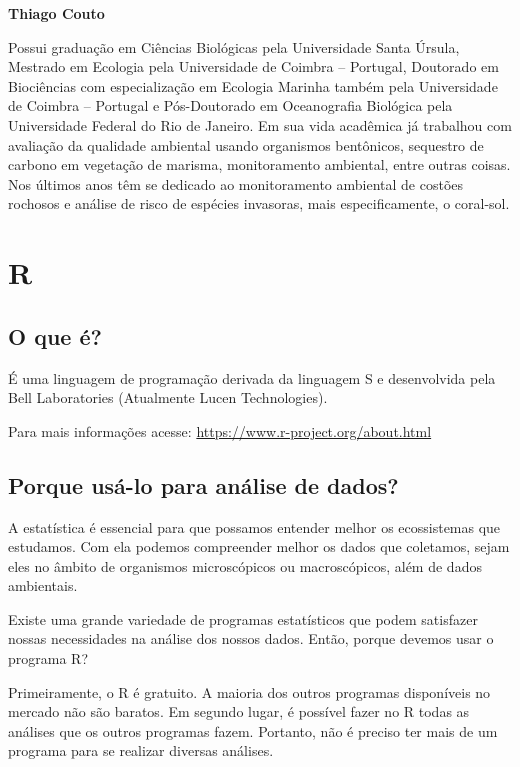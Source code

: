\documentclass[titlepage, oneside, openany, a4paper]{book}
\begin{document}
\textbf{Thiago Couto}

Possui graduação em Ciências Biológicas pela Universidade Santa Úrsula, Mestrado em Ecologia pela Universidade de Coimbra -- Portugal, Doutorado em Biociências com especialização em Ecologia Marinha também pela Universidade de Coimbra -- Portugal e Pós-Doutorado em Oceanografia Biológica pela Universidade Federal do Rio de Janeiro. Em sua vida acadêmica já trabalhou com avaliação da qualidade ambiental usando organismos bentônicos, sequestro de carbono em vegetação de marisma, monitoramento ambiental, entre outras coisas. Nos últimos anos têm se dedicado ao monitoramento ambiental de costões rochosos e análise de risco de espécies invasoras, mais especificamente, o coral-sol.

\hypertarget{r}{%
\chapter{R}\label{r}}

\hypertarget{o-que-uxe9}{%
\section{O que é?}\label{o-que-uxe9}}

É uma linguagem de programação derivada da linguagem S e desenvolvida pela Bell Laboratories (Atualmente Lucen Technologies).

Para mais informações acesse: \url{https://www.r-project.org/about.html}

\hypertarget{porque-usuxe1-lo-para-anuxe1lise-de-dados}{%
\section{Porque usá-lo para análise de dados?}\label{porque-usuxe1-lo-para-anuxe1lise-de-dados}}

A estatística é essencial para que possamos entender melhor os ecossistemas que estudamos. Com ela podemos compreender melhor os dados que coletamos, sejam eles no âmbito de organismos microscópicos ou macroscópicos, além de dados ambientais.

Existe uma grande variedade de programas estatísticos que podem satisfazer nossas necessidades na análise dos nossos dados. Então, porque devemos usar o programa R?

Primeiramente, o R é gratuito. A maioria dos outros programas disponíveis no mercado não são baratos. Em segundo lugar, é possível fazer no R todas as análises que os outros programas fazem. Portanto, não é preciso ter mais de um programa para se realizar diversas análises.
\end{document}
